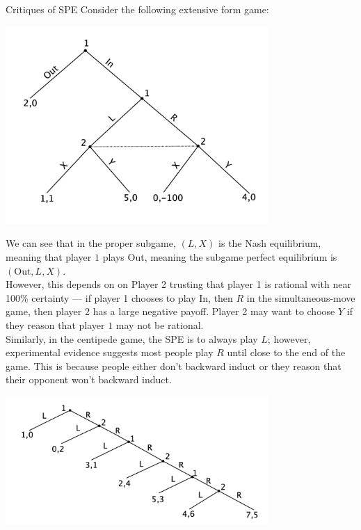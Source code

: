 \documentclass[10pt]{extarticle}
\begin{document}
  \begin{problem}{Critiques of SPE}
    Consider the following extensive form game:
    \begin{center}
      \includegraphics[width=10cm]{images/spe_critique.png}
    \end{center}
    We can see that in the proper subgame, $(L,X)$ is the Nash equilibrium, meaning that player $1$ plays Out, meaning the subgame perfect equilibrium is $(\text{Out},L,X)$.\\

    However, this depends on on Player 2 trusting that player 1 is rational with near 100\% certainty --- if player 1 chooses to play In, then $R$ in the simultaneous-move game, then player 2 has a large negative payoff. Player 2 may want to choose $Y$ if they reason that player $1$ may not be rational.\\

    Similarly, in the centipede game, the SPE is to always play $L$; however, experimental evidence suggests most people play $R$ until close to the end of the game. This is because people either don't backward induct or they reason that their opponent won't backward induct.
    \begin{center}
      \includegraphics[width=10cm]{images/centipede.png}
    \end{center}
  \end{problem}
\end{document}
